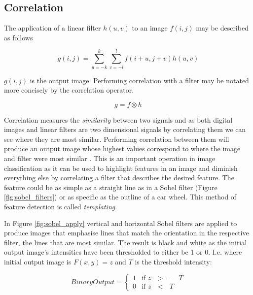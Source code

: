 \subsection{Correlation}
\label{subsection:corr}
The application of a linear filter $h(u,v)$ to an image $f(i,j)$ may be described as follows

\begin{equation} \label{eq:1}
g(i,j) = \sum_{u=-k}^{k}\sum_{v = -l}^{l}f(i+u,j+v)h(u,v)
\end{equation}

$g(i,j)$ is the output image. Performing correlation with a filter may be notated more concisely by the correlation operator.

\[g = f \otimes h\]

Correlation measures the \emph{similarity} between two signals and as both digital images and linear filters are two dimensional signals by correlating them we can see where they are most similar. Performing correlation between them will produce an output image whose highest values correspond to where the image and filter were most similar \cite{optimalKernel}. This is an important operation in image classification as it can be used to highlight features in an image and diminish everything else by correlating a filter that describes the desired feature. The feature could be as simple as a straight line as in a Sobel filter (Figure \ref{fig:sobel_filters}) or as specific as the outline of a car wheel. This method of feature detection is called \emph{templating}.

In Figure \ref{fig:sobel_apply} vertical and horizontal Sobel filters are applied to produce images that emphasise lines that match the orientation in the respective filter, the lines that are most similar. The result is black and white as the initial output image's intensities have been thresholded to either be 1 or 0. I.e. where initial output image is $F(x,y) = z$ and $T$ is the threshold intensity:

\begin{equation}
  Binary Output = 
  \begin{cases}
    1 & \text{if $z$ $>=$ $T$} \\
    0 & \text{if $z$ $<$  $T$}
  \end{cases}
  \label{eq:threshold}
\end{equation}

